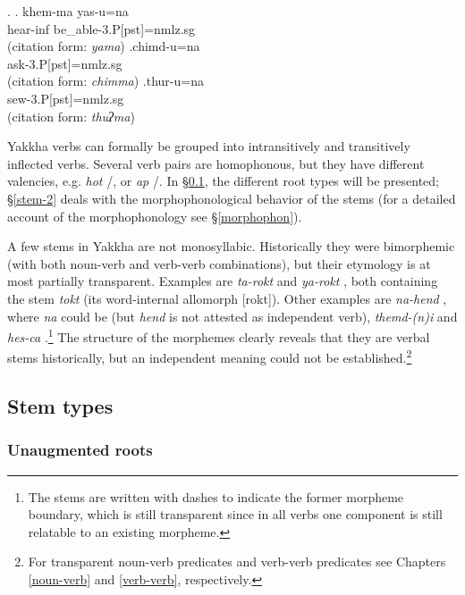 \ex. \ag. khem-ma yas-u=na\\
 hear{\sc -inf} be\_able{\sc -3.P[pst]=nmlz.sg}\\
 (citation form: \emph{yama})
\bg.chimd-u=na\\
ask{\sc -3.P[pst]=nmlz.sg}\\
 (citation form: \emph{chimma})
\bg.thur-u=na\\
sew{\sc -3.P[pst]=nmlz.sg}\\
 (citation form: \emph{thuʔma})


Yakkha verbs can  formally  be grouped into intransitively and transitively inflected verbs. Several verb pairs are homophonous, but they have different valencies, e.g. \emph{hot} /, or \emph{ap}   /. In §\ref{stem-1}, the different root types will be presented; §\ref{stem-2} deals with the morphophonological behavior of the stems (for a detailed account of the morphophonology see §\ref{morphophon}).

A few stems in Yakkha are not monosyllabic. Historically they were bimorphemic (with both noun-verb and verb-verb combinations), but their etymology is at most partially transparent. Examples are \emph{ta-rokt}  and \emph{ya-rokt} , both containing the stem \emph{tokt}  (its word-internal allomorph [rokt]). Other examples are  \emph{na-hend} , where \emph{na} could be  (but \emph{hend} is not attested as independent verb), \emph{themd-(n)i}  and \emph{hes-ca} .\footnote{The stems are written with dashes to indicate the former morpheme boundary, which is still transparent since in all verbs one component is still relatable to an existing  morpheme.} The structure of the morphemes clearly reveals that they are verbal stems historically, but an independent  meaning could not be established.\footnote{For transparent noun-verb predicates and verb-verb predicates see Chapters \ref{noun-verb} and \ref{verb-verb}, respectively.}

\subsection{Stem types}\label{stem-1}
\subsubsection{Unaugmented roots}\label{unaugmented}

